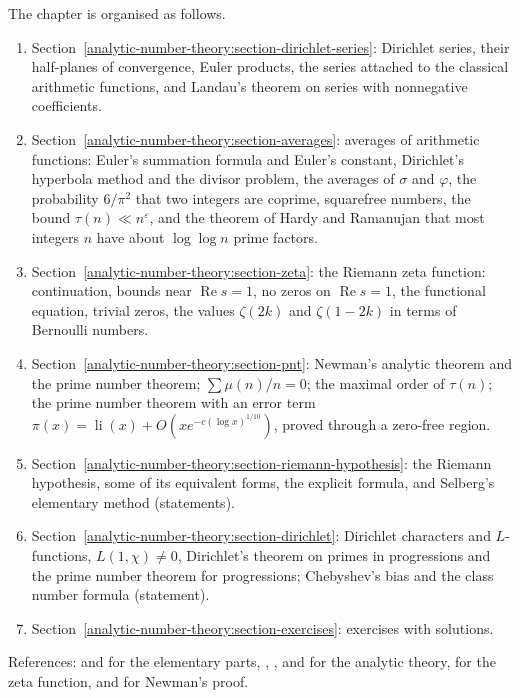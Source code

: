 The chapter is organised as follows.
\begin{enumerate}
\item Section~\ref{analytic-number-theory:section-dirichlet-series}: Dirichlet series, their half-planes of convergence, Euler products, the series attached to the classical arithmetic functions, and
Landau's theorem on series with nonnegative coefficients.
\item Section~\ref{analytic-number-theory:section-averages}: averages of arithmetic functions: Euler's summation formula and Euler's constant, Dirichlet's hyperbola method and the divisor
problem, the averages of $\sigma$ and $\varphi$, the probability $6/\pi^2$ that two integers are coprime, squarefree numbers, the bound $\tau(n) \ll n^\varepsilon$, and the theorem of Hardy and Ramanujan
that most integers $n$ have about $\log\log n$ prime factors.
\item Section~\ref{analytic-number-theory:section-zeta}: the Riemann zeta function: continuation, bounds near $\operatorname{Re}s = 1$, no zeros on $\operatorname{Re}s = 1$, the functional equation,
trivial zeros, the values $\zeta(2k)$ and $\zeta(1 - 2k)$ in terms of Bernoulli numbers.
\item Section~\ref{analytic-number-theory:section-pnt}: Newman's analytic theorem and the prime number theorem; $\sum\mu(n)/n = 0$; the maximal order of $\tau(n)$; the prime number theorem with an
error term $\pi(x) = \operatorname{li}(x) + O(xe^{-c(\log x)^{1/10}})$, proved through a zero-free region.
\item Section~\ref{analytic-number-theory:section-riemann-hypothesis}: the Riemann hypothesis, some of its equivalent forms, the explicit formula, and Selberg's elementary method (statements).
\item Section~\ref{analytic-number-theory:section-dirichlet}: Dirichlet characters and $L$-functions, $L(1, \chi) \neq 0$, Dirichlet's theorem on primes in
progressions and the prime number theorem for progressions; Chebyshev's bias and the class number formula (statement).
\item Section~\ref{analytic-number-theory:section-exercises}: exercises with solutions.
\end{enumerate}
References: \cite{apostol-analytic} and \cite{hardy-wright} for the elementary parts, \cite{davenport-multiplicative}, \cite{montgomery-vaughan}, \cite{tenenbaum-analytic} and
\cite{iwaniec-kowalski} for the analytic theory, \cite{titchmarsh-zeta} for the zeta function, and \cite{zagier-newman} for Newman's proof.


